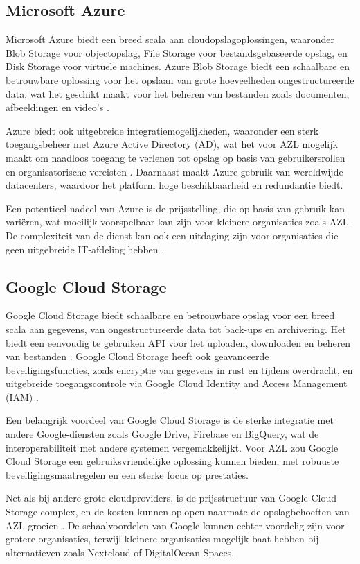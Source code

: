 \subsection{Microsoft Azure}
Microsoft Azure biedt een breed scala aan cloudopslagoplossingen, waaronder Blob Storage voor objectopslag, File Storage voor bestandsgebaseerde opslag, en Disk Storage voor virtuele machines. Azure Blob Storage biedt een schaalbare en betrouwbare oplossing voor het opslaan van grote hoeveelheden ongestructureerde data, wat het geschikt maakt voor het beheren van bestanden zoals documenten, afbeeldingen en video's \autocite{azure_blob}.

Azure biedt ook uitgebreide integratiemogelijkheden, waaronder een sterk toegangsbeheer met Azure Active Directory (AD), wat het voor AZL mogelijk maakt om naadloos toegang te verlenen tot opslag op basis van gebruikersrollen en organisatorische vereisten \autocite{azure_ad}. Daarnaast maakt Azure gebruik van wereldwijde datacenters, waardoor het platform hoge beschikbaarheid en redundantie biedt.

Een potentieel nadeel van Azure is de prijsstelling, die op basis van gebruik kan variëren, wat moeilijk voorspelbaar kan zijn voor kleinere organisaties zoals AZL. De complexiteit van de dienst kan ook een uitdaging zijn voor organisaties die geen uitgebreide IT-afdeling hebben \autocite{azure_pricing}.

\subsection{Google Cloud Storage}
Google Cloud Storage biedt schaalbare en betrouwbare opslag voor een breed scala aan gegevens, van ongestructureerde data tot back-ups en archivering. Het biedt een eenvoudig te gebruiken API voor het uploaden, downloaden en beheren van bestanden \autocite{google_storage}. Google Cloud Storage heeft ook geavanceerde beveiligingsfuncties, zoals encryptie van gegevens in rust en tijdens overdracht, en uitgebreide toegangscontrole via Google Cloud Identity and Access Management (IAM) \autocite{google_iam}.

Een belangrijk voordeel van Google Cloud Storage is de sterke integratie met andere Google-diensten zoals Google Drive, Firebase en BigQuery, wat de interoperabiliteit met andere systemen vergemakkelijkt. Voor AZL zou Google Cloud Storage een gebruiksvriendelijke oplossing kunnen bieden, met robuuste beveiligingsmaatregelen en een sterke focus op prestaties.

Net als bij andere grote cloudproviders, is de prijsstructuur van Google Cloud Storage complex, en de kosten kunnen oplopen naarmate de opslagbehoeften van AZL groeien \autocite{google_pricing}. De schaalvoordelen van Google kunnen echter voordelig zijn voor grotere organisaties, terwijl kleinere organisaties mogelijk baat hebben bij alternatieven zoals Nextcloud of DigitalOcean Spaces.



